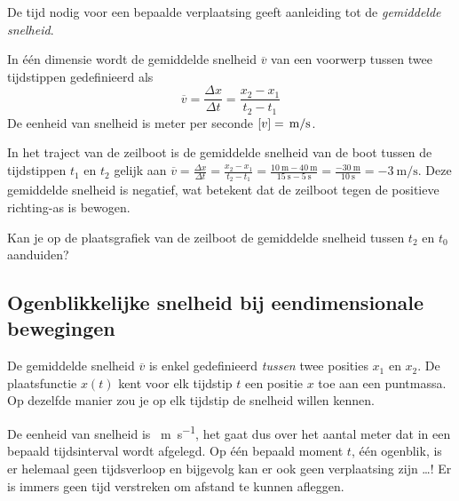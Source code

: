 \documentclass{ximera}
\begin{document}


De tijd nodig voor een bepaalde verplaatsing geeft aanleiding tot de \textit{gemiddelde snelheid}. 


\begin{definition}
	
In één dimensie wordt de gemiddelde snelheid $\overline{v}$ van een voorwerp tussen twee tijdstippen gedefinieerd als
\[
\overline{v}=\frac{\Delta x}{\Delta t}=\frac{x_2-x_1}{t_2-t_1}
\]
De eenheid van snelheid is meter per seconde $[v]=\rm\,m/s$. 
\end{definition}


In het traject van de zeilboot is de gemiddelde snelheid van de boot tussen de tijdstippen $t_1$ en $t_2$ gelijk aan 
$\overline{v} =\frac{\Delta x}{\Delta t} =\frac{x_2-x_1}{t_2-t_1}=\frac{\SI{10}{\meter} - \SI{40}{\meter}}{\SI{15}{\second} - \SI{5}{\second}}= \frac{\SI{-30}{\meter}}{\SI{10}{\second}} = \SI{-3}{\meter\per\second}$. 
Deze gemiddelde snelheid is negatief, wat betekent dat de zeilboot tegen de positieve richting-as is bewogen. 


\begin{quickquestion*}{}{}
Kan je op de plaatsgrafiek van de zeilboot de gemiddelde snelheid tussen \(t_2\) en \(t_0\) aanduiden? 
\end{quickquestion*}



\subsection*{Ogenblikkelijke snelheid bij eendimensionale bewegingen}

De gemiddelde snelheid \(\overline{v}\) is enkel gedefinieerd \textit{tussen} twee posities \(x_1\) en \(x_2\). 
De plaatsfunctie \(x(t)\) kent voor elk tijdstip \(t\) een positie \(x\) toe aan een puntmassa. Op dezelfde manier zou je op elk tijdstip de snelheid willen kennen. 

De eenheid van snelheid is \SI{}{\meter\per\second}, het gaat dus over het aantal meter dat in een bepaald tijds\-in\-ter\-val wordt afgelegd. 
Op één bepaald moment \(t\), één ogenblik, is er helemaal geen tijdsverloop en bijgevolg kan er ook geen verplaatsing zijn \ldots! Er is immers geen tijd verstreken om afstand te kunnen afleggen.
\end{document}
